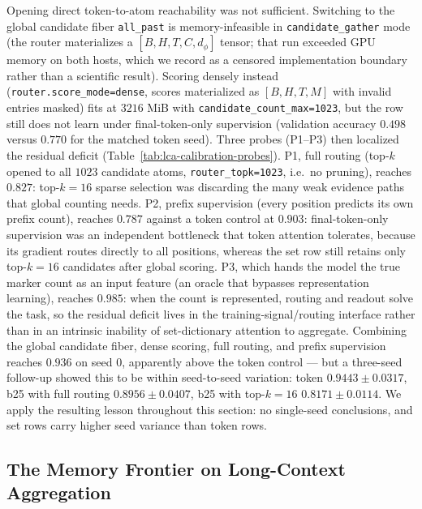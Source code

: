 \documentclass{article}
\theoremstyle{plain}
\theoremstyle{definition}
\theoremstyle{remark}
\begin{document}
Opening direct token-to-atom reachability was not sufficient.  Switching to the
global candidate fiber \texttt{all\_past} is memory-infeasible in
\texttt{candidate\_gather}
mode (the router materializes a $[B,H,T,C,d_\phi]$ tensor; that run exceeded
GPU memory on both hosts, which we record as a censored implementation
boundary rather than a scientific result).  Scoring densely instead
(\texttt{router.score\_mode=dense}, scores materialized as $[B,H,T,M]$ with
invalid entries masked) fits at $3216$ MiB with
\texttt{candidate\_count\_max=1023}, but the row still does not learn under
final-token-only supervision (validation accuracy $0.498$ versus $0.770$ for
the matched token seed).  Three probes (P1--P3) then localized the residual
deficit (Table~\ref{tab:lca-calibration-probes}).  P1, full routing
(top-$k$ opened to all $1023$ candidate atoms, \texttt{router\_topk=1023},
i.e.\ no pruning), reaches $0.827$: top-$k{=}16$ sparse selection
was discarding the many weak evidence paths that global counting needs.  P2,
prefix supervision (every position predicts its own prefix count), reaches
$0.787$ against a token control at $0.903$: final-token-only supervision was an
independent bottleneck that token attention tolerates, because its gradient
routes directly to all positions, whereas the set row still retains only
top-$k{=}16$ candidates after global scoring.
P3, which hands the model the true marker count as an input feature (an
oracle that bypasses representation learning), reaches $0.985$: when the
count is represented,
routing and readout solve the task, so the residual deficit lives in the
training-signal/routing interface rather than in an intrinsic inability of
set-dictionary attention to aggregate.  Combining the global candidate fiber,
dense scoring, full routing, and prefix supervision
reaches $0.936$ on seed 0, apparently above the token control --- but a
three-seed follow-up showed this to be within seed-to-seed variation: token
$0.9443\pm0.0317$, b25 with full routing $0.8956\pm0.0407$, b25 with
top-$k{=}16$ $0.8171\pm0.0114$.  We apply the resulting lesson throughout this
section: no single-seed conclusions, and set rows carry higher seed variance
than token rows.



\subsection{The Memory Frontier on Long-Context Aggregation}
\label{sec:results-lca-frontier}
\end{document}

